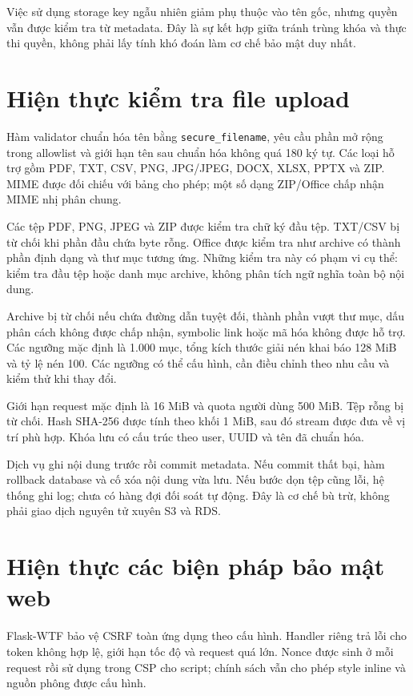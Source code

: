 Việc sử dụng storage key ngẫu nhiên giảm phụ thuộc vào tên gốc, nhưng quyền vẫn được kiểm tra từ metadata. Đây là sự kết hợp giữa tránh trùng khóa và thực thi quyền, không phải lấy tính khó đoán làm cơ chế bảo mật duy nhất.

\section{Hiện thực kiểm tra file upload}
Hàm validator chuẩn hóa tên bằng \texttt{secure\_filename}, yêu cầu phần mở rộng trong allowlist và giới hạn tên sau chuẩn hóa không quá 180 ký tự. Các loại hỗ trợ gồm PDF, TXT, CSV, PNG, JPG/JPEG, DOCX, XLSX, PPTX và ZIP. MIME được đối chiếu với bảng cho phép; một số dạng ZIP/Office chấp nhận MIME nhị phân chung.

Các tệp PDF, PNG, JPEG và ZIP được kiểm tra chữ ký đầu tệp. TXT/CSV bị từ chối khi phần đầu chứa byte rỗng. Office được kiểm tra như archive có thành phần định dạng và thư mục tương ứng. Những kiểm tra này có phạm vi cụ thể: kiểm tra đầu tệp hoặc danh mục archive, không phân tích ngữ nghĩa toàn bộ nội dung.

Archive bị từ chối nếu chứa đường dẫn tuyệt đối, thành phần vượt thư mục, dấu phân cách không được chấp nhận, symbolic link hoặc mã hóa không được hỗ trợ. Các ngưỡng mặc định là 1.000 mục, tổng kích thước giải nén khai báo 128 MiB và tỷ lệ nén 100. Các ngưỡng có thể cấu hình, cần điều chỉnh theo nhu cầu và kiểm thử khi thay đổi.

Giới hạn request mặc định là 16 MiB và quota người dùng 500 MiB. Tệp rỗng bị từ chối. Hash SHA-256 được tính theo khối 1 MiB, sau đó stream được đưa về vị trí phù hợp. Khóa lưu có cấu trúc theo user, UUID và tên đã chuẩn hóa.

Dịch vụ ghi nội dung trước rồi commit metadata. Nếu commit thất bại, hàm rollback database và cố xóa nội dung vừa lưu. Nếu bước dọn tệp cũng lỗi, hệ thống ghi log; chưa có hàng đợi đối soát tự động. Đây là cơ chế bù trừ, không phải giao dịch nguyên tử xuyên S3 và RDS.

\section{Hiện thực các biện pháp bảo mật web}
Flask-WTF bảo vệ CSRF toàn ứng dụng theo cấu hình. Handler riêng trả lỗi cho token không hợp lệ, giới hạn tốc độ và request quá lớn. Nonce được sinh ở mỗi request rồi sử dụng trong CSP cho script; chính sách vẫn cho phép style inline và nguồn phông được cấu hình.

